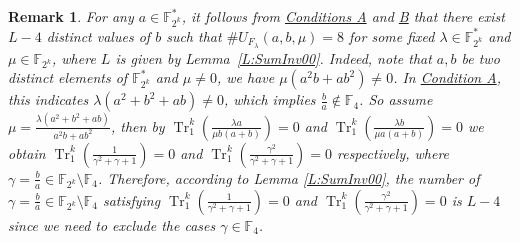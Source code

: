 \documentclass[preprint,10pt]{elsarticle}
\newcommand{\F}{\mathbb{F}}
\newcommand{\0}{\textbf{0}}
\newcommand{\1}{\textbf{1}}
\newcommand{\TRACE}{\operatorname{Tr}_1^k}
\theoremstyle{plain}
\newtheorem{remark}{Remark}
\begin{document}
    \begin{remark}
        For any $a\in\F_{2^k}^*$, it follows from \hyperref[item_a]{Conditions A} and \hyperref[item_b]{B} that there exist $L-4$ distinct values of $b$
        such that $\#U_{F_{\lambda}}(a,b,\mu)=8$ for some fixed $\lambda\in\F_{2^k}^*$ and $\mu\in\F_{2^k}$,
        where $L$ is given by Lemma~\ref{L:SumInv00}.
       Indeed, note that $a,b$ be two distinct elements of $\F_{2^k}^*$ and $\mu\ne 0$,
        we have $\mu(a^2b+ab^2)\ne 0$.
        In \hyperref[item_a]{Condition A}, this indicates $\lambda(a^2+b^2+ab)\ne 0$,
        which implies $\frac{b}{a}\notin\F_4$.
        So assume $\mu=\frac{\lambda(a^2+b^2+ab)}{a^2b+ab^2}$,
        then by  $\TRACE\left(\frac{\lambda a}{\mu b(a+b)}\right)=0$
        and $\TRACE\left(\frac{\lambda b}{\mu a(a+b)}\right)=0$
        we obtain $\TRACE\left(\frac{1}{\gamma^2+\gamma+1}\right)=0$ and $\TRACE\left(\frac{\gamma^2}{\gamma^2+\gamma+1}\right)=0$ respectively,
        where $\gamma=\frac{b}{a}\in\F_{2^k}\setminus\F_{4}$.
        Therefore, according to Lemma \ref{L:SumInv00},
        the number of $\gamma=\frac{b}{a}\in\F_{2^k}\setminus\F_{4}$ satisfying
        $\TRACE\left(\frac{1}{\gamma^2+\gamma+1}\right)=0$ and $\TRACE\left(\frac{\gamma^2}{\gamma^2+\gamma+1}\right)=0$
        is $L-4$ since we need to exclude the cases $\gamma\in\F_4$.
    \end{remark}
\end{document}
